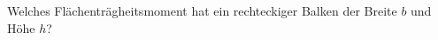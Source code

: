 \subsection{}

Welches Flächenträgheitsmoment hat ein rechteckiger Balken der Breite $b$ und Höhe $h$?
